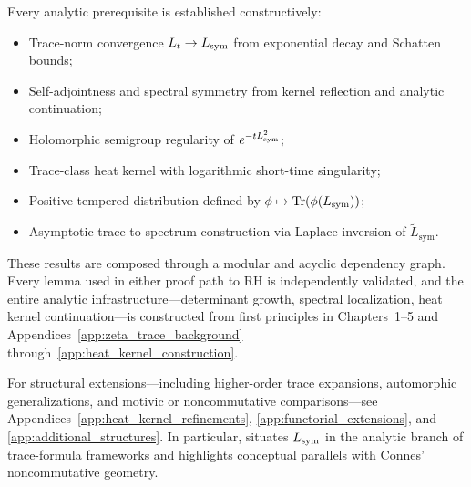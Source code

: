 \medskip

\noindent
Every analytic prerequisite is established constructively:
\begin{itemize}
  \item Trace-norm convergence \( L_t \to L_{\mathrm{sym}} \) from exponential decay and Schatten bounds;
  \item Self-adjointness and spectral symmetry from kernel reflection and analytic continuation;
  \item Holomorphic semigroup regularity of \( e^{-t L_{\mathrm{sym}}^2} \);
  \item Trace-class heat kernel with logarithmic short-time singularity;
  \item Positive tempered distribution defined by \( \phi \mapsto \operatorname{Tr}(\phi(L_{\mathrm{sym}})) \);
  \item Asymptotic trace-to-spectrum construction via Laplace inversion of \( \tilde{L}_{\mathrm{sym}} \).
\end{itemize}

\medskip

\noindent
These results are composed through a modular and acyclic dependency graph. Every lemma used in either proof path to RH is independently validated, and the entire analytic infrastructure—determinant growth, spectral localization, heat kernel continuation—is constructed from first principles in Chapters~1–5 and Appendices~\ref{app:zeta_trace_background} through~\ref{app:heat_kernel_construction}.

\medskip

\noindent
For structural extensions—including higher-order trace expansions, automorphic generalizations, and motivic or noncommutative comparisons—see Appendices~\ref{app:heat_kernel_refinements}, \ref{app:functorial_extensions}, and \ref{app:additional_structures}. In particular,  situates \( L_{\mathrm{sym}} \) in the analytic branch of trace-formula frameworks and highlights conceptual parallels with Connes’ noncommutative geometry.

